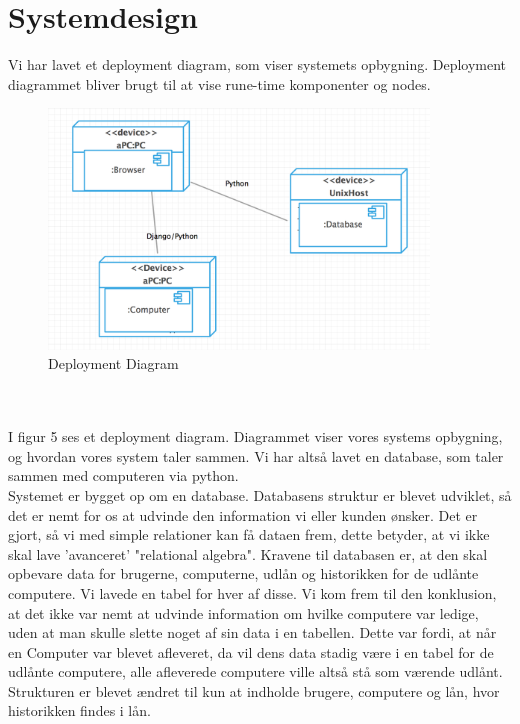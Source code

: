 \documentclass[a4paper]{article}
\begin{document}
\section{Systemdesign}
Vi har lavet et deployment diagram, som viser systemets opbygning. Deployment diagrammet bliver brugt til at vise rune-time komponenter og nodes. \cite[p~256]{OOSE}
\begin{figure}[h!]
\includegraphics[width=0.9\textwidth]{deploymentdiagram.png}
  \caption{Deployment Diagram}
  \centering
\end{figure} \\ \\
I figur 5 ses et deployment diagram. Diagrammet viser vores systems opbygning, og hvordan vores system taler sammen. Vi har altså lavet en database, som taler sammen med computeren via python. \\
Systemet er bygget op om en database. Databasens struktur er blevet udviklet, så det er nemt for os at udvinde den information vi eller kunden ønsker. Det er gjort, så vi med simple relationer kan få dataen frem, dette betyder, at vi ikke skal lave 'avanceret' "relational algebra". Kravene til databasen er, at den skal opbevare data for brugerne, computerne, udlån og historikken for de udlånte computere. Vi lavede en tabel for hver af disse. Vi kom frem til den konklusion, at det ikke var nemt at udvinde information om hvilke computere var ledige, uden at man skulle slette noget af sin data i en tabellen. Dette var fordi, at når en Computer var blevet afleveret, da vil dens data stadig være i en tabel for de udlånte computere, alle afleverede computere ville altså stå som værende udlånt. Strukturen er blevet ændret til kun at indholde brugere, computere og lån, hvor historikken findes i lån. \\ \\
\end{document}

